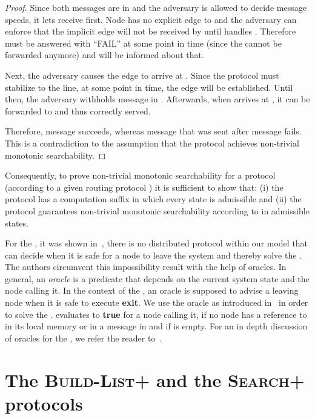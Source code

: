 \documentclass[a4paper,USenglish]{lipics}
\newcommand{\blp}{\textsc{Build-List+}\xspace}
\newcommand{\srp}{\textsc{Search+}\xspace}
\newcommand{\fdp}{\xspace}
\newcommand{\nidec}{\xspace}
\begin{document}
\begin{proof}
 Since both messages are in  and the adversary is allowed to decide message speeds, it lets  receive  first.
 Node  has no explicit edge to  and the adversary can enforce that the implicit edge  will not be received by  until  handles . Therefore  must be answered with ``FAIL'' at some point in time (since the  cannot be forwarded anymore) and  will be informed about that.

 Next, the adversary causes the edge  to arrive at .
 Since the protocol must stabilize to the line, at some point in time, the edge  will be established.
 Until then, the adversary withholds message  in .
 Afterwards, when  arrives at , it can be forwarded to  and thus correctly served.
 
 Therefore, message  succeeds, whereas message  that was sent after message  fails.
 This is a contradiction to the assumption that the protocol achieves non-trivial monotonic searchability. 
\end{proof}


Consequently, to prove non-trivial monotonic searchability for a protocol (according to a given routing protocol ) it is sufficient to show that: (i) the protocol has a computation suffix in which every state is admissible and (ii) the protocol guarantees non-trivial monotonic searchability according to  in admissible states.

For the \fdp, it was shown in~\cite{departure1}, there is no distributed protocol within our model that can decide when it is safe for a node  to leave the system and thereby solve the \fdp.
The authors circumvent this impossibility result with the help of oracles.
In general, an \emph{oracle} is a predicate that depends on the current system state and the node calling it. 
In the context of the \fdp, an oracle is supposed to advise a leaving node when it is safe to execute \textbf{exit}.
We use the oracle \nidec as introduced in~\cite{departure1} in order to solve the \fdp. 
\nidec evaluates to \textbf{true} for a node  calling it, if no node  has a reference to  in its local memory or in a message in  and if  is empty. For an in depth discussion of oracles for the \fdp, we refer the reader to~\cite{departure1,KoutsopoulosSS15}. 


\section{The \blp and the \srp protocols}
\label{sec:blpAlgorithm}
\end{document}
